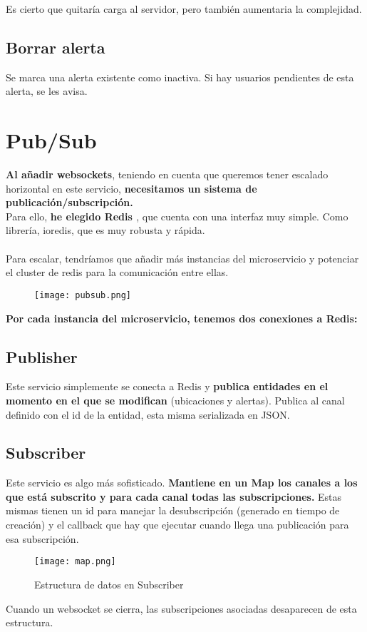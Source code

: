 Es cierto que quitaría carga al servidor, pero también aumentaria la complejidad.

\subsection{Borrar alerta}
Se marca una alerta existente como inactiva. Si hay usuarios pendientes de esta alerta, se les avisa.


\section{Pub/Sub}\label{sec:pubsub}
\textbf{Al añadir websockets}, teniendo en cuenta que queremos tener escalado horizontal en este servicio,
\textbf{necesitamos un sistema de publicación/subscripción.} \\
Para ello, \textbf{he elegido Redis \cite{redis}}, que cuenta con una interfaz muy simple. Como librería, ioredis, 
que es muy robusta y rápida.\\ \\

Para escalar, tendríamos que añadir más instancias del microservicio y potenciar el cluster de redis para la comunicación entre ellas.

\begin{figure}[H]
	\centering	
	\texttt{[image: pubsub.png]}
	\end{figure}

\textbf{Por cada instancia del microservicio, tenemos dos conexiones a Redis:}
\subsection{Publisher}

Este servicio simplemente se conecta a Redis y \textbf{publica entidades en el momento en el que se modifican} (ubicaciones y alertas).
Publica al canal definido con el id de la entidad, esta misma serializada en JSON.

\subsection{Subscriber}
Este servicio es algo más sofisticado. \textbf{Mantiene en un Map los canales a los que está subscrito y 
para cada canal todas las subscripciones.} Estas mismas tienen un id para manejar la desubscripción (generado en tiempo de creación) y 
el callback que hay que ejecutar cuando llega una publicación para esa subscripción. 
\begin{figure}[H]
	\centering	
	\texttt{[image: map.png]}
	\caption{Estructura de datos en Subscriber}
	\end{figure}
Cuando un websocket se cierra, las subscripciones asociadas desaparecen de esta estructura.
